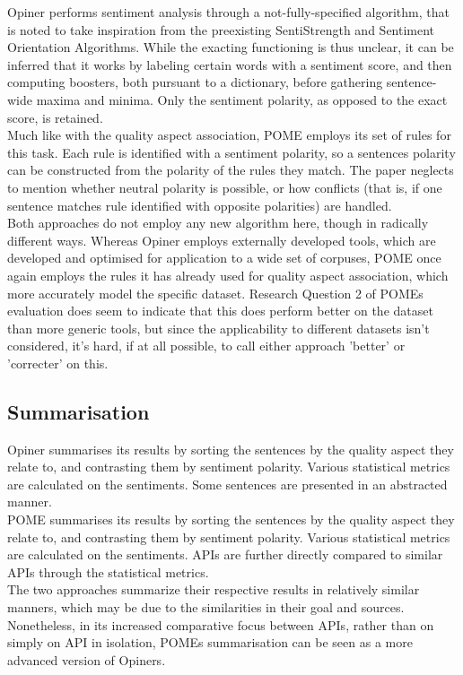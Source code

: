 \documentclass[a4paper,10pt, bibliography=totocnumbered]{scrreprt}
\begin{document}
Opiner performs sentiment analysis through a not-fully-specified algorithm, that is noted to take inspiration from the preexisting SentiStrength and Sentiment Orientation Algorithms. While the exacting functioning is thus unclear, it can be inferred that it works by labeling certain words with a sentiment score, and then computing boosters, both pursuant to a dictionary, before gathering sentence-wide maxima and minima. Only the sentiment polarity, as opposed to the exact score, is retained.\\
Much like with the quality aspect association, POME employs its set of rules for this task. Each rule is identified with a sentiment polarity, so a sentences polarity can be constructed from the polarity of the rules they match. The paper neglects to mention whether neutral polarity is possible, or how conflicts (that is, if one sentence matches rule identified with opposite polarities) are handled.\\
Both approaches do not employ any new algorithm here, though in radically different ways. Whereas Opiner employs externally developed tools, which are developed and optimised for application to a wide set of corpuses, POME once again employs the rules it has already used for quality aspect association, which more accurately model the specific dataset. Research Question 2 of POMEs evaluation does seem to indicate that this does perform better on the dataset than more generic tools, but since the applicability to different datasets isn't considered, it's hard, if at all possible, to call either approach 'better' or 'correcter' on this.

\subsection{Summarisation}

Opiner summarises its results by sorting the sentences by the quality aspect they relate to, and contrasting them by sentiment polarity. Various statistical metrics are calculated on the sentiments. Some sentences are presented in an abstracted manner.\\
POME summarises its results by sorting the sentences by the quality aspect they relate to, and contrasting them by sentiment polarity. Various statistical metrics are calculated on the sentiments. APIs are further directly compared to similar APIs through the statistical metrics.\\
The two approaches summarize their respective results in relatively similar manners, which may be due to the similarities in their goal and sources. Nonetheless, in its increased comparative focus between APIs, rather than on simply on API in isolation, POMEs summarisation can be seen as a more advanced version of Opiners.
\end{document}

